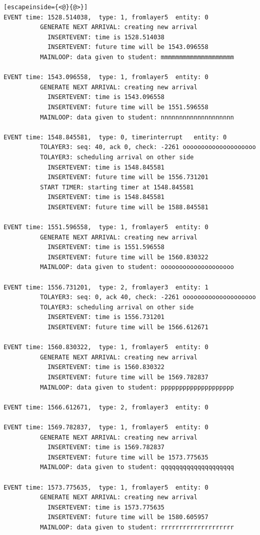 \documentclass[paper=a4, fontsize=11pt]{scrartcl}
\numberwithin{equation}{section}		%
\numberwithin{figure}{section}			%
\numberwithin{table}{section}				%
\begin{document}
\begin{lstlisting}[escapeinside={<@}{@>}]
EVENT time: 1528.514038,  type: 1, fromlayer5  entity: 0
          GENERATE NEXT ARRIVAL: creating new arrival
            INSERTEVENT: time is 1528.514038
            INSERTEVENT: future time will be 1543.096558
          MAINLOOP: data given to student: mmmmmmmmmmmmmmmmmmmm

EVENT time: 1543.096558,  type: 1, fromlayer5  entity: 0
          GENERATE NEXT ARRIVAL: creating new arrival
            INSERTEVENT: time is 1543.096558
            INSERTEVENT: future time will be 1551.596558
          MAINLOOP: data given to student: nnnnnnnnnnnnnnnnnnnn

EVENT time: 1548.845581,  type: 0, timerinterrupt   entity: 0
          TOLAYER3: seq: 40, ack 0, check: -2261 oooooooooooooooooooo
          TOLAYER3: scheduling arrival on other side
            INSERTEVENT: time is 1548.845581
            INSERTEVENT: future time will be 1556.731201
          START TIMER: starting timer at 1548.845581
            INSERTEVENT: time is 1548.845581
            INSERTEVENT: future time will be 1588.845581

EVENT time: 1551.596558,  type: 1, fromlayer5  entity: 0
          GENERATE NEXT ARRIVAL: creating new arrival
            INSERTEVENT: time is 1551.596558
            INSERTEVENT: future time will be 1560.830322
          MAINLOOP: data given to student: oooooooooooooooooooo

EVENT time: 1556.731201,  type: 2, fromlayer3  entity: 1
          TOLAYER3: seq: 0, ack 40, check: -2261 oooooooooooooooooooo
          TOLAYER3: scheduling arrival on other side
            INSERTEVENT: time is 1556.731201
            INSERTEVENT: future time will be 1566.612671

EVENT time: 1560.830322,  type: 1, fromlayer5  entity: 0
          GENERATE NEXT ARRIVAL: creating new arrival
            INSERTEVENT: time is 1560.830322
            INSERTEVENT: future time will be 1569.782837
          MAINLOOP: data given to student: pppppppppppppppppppp

EVENT time: 1566.612671,  type: 2, fromlayer3  entity: 0

EVENT time: 1569.782837,  type: 1, fromlayer5  entity: 0
          GENERATE NEXT ARRIVAL: creating new arrival
            INSERTEVENT: time is 1569.782837
            INSERTEVENT: future time will be 1573.775635
          MAINLOOP: data given to student: qqqqqqqqqqqqqqqqqqqq

EVENT time: 1573.775635,  type: 1, fromlayer5  entity: 0
          GENERATE NEXT ARRIVAL: creating new arrival
            INSERTEVENT: time is 1573.775635
            INSERTEVENT: future time will be 1580.605957
          MAINLOOP: data given to student: rrrrrrrrrrrrrrrrrrrr


\end{lstlisting}
\end{document}
